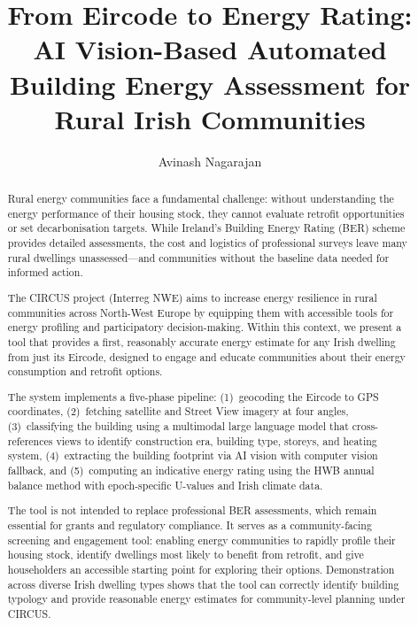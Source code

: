 \documentclass[preprint,12pt,authoryear]{elsarticle}
\begin{document}
\begin{frontmatter}

\title{From Eircode to Energy Rating: AI Vision-Based Automated Building Energy Assessment for Rural Irish Communities}

\author[mtu]{Avinash Nagarajan}


\begin{abstract}
Rural energy communities face a fundamental challenge: without understanding the energy performance of their housing stock, they cannot evaluate retrofit opportunities or set decarbonisation targets. While Ireland's Building Energy Rating (BER) scheme provides detailed assessments, the cost and logistics of professional surveys leave many rural dwellings unassessed---and communities without the baseline data needed for informed action.

The CIRCUS project (Interreg NWE) aims to increase energy resilience in rural communities across North-West Europe by equipping them with accessible tools for energy profiling and participatory decision-making. Within this context, we present a tool that provides a first, reasonably accurate energy estimate for any Irish dwelling from just its Eircode, designed to engage and educate communities about their energy consumption and retrofit options.

The system implements a five-phase pipeline: (1)~geocoding the Eircode to GPS coordinates, (2)~fetching satellite and Street View imagery at four angles, (3)~classifying the building using a multimodal large language model that cross-references views to identify construction era, building type, storeys, and heating system, (4)~extracting the building footprint via AI vision with computer vision fallback, and (5)~computing an indicative energy rating using the HWB annual balance method with epoch-specific U-values and Irish climate data.

The tool is not intended to replace professional BER assessments, which remain essential for grants and regulatory compliance. It serves as a community-facing screening and engagement tool: enabling energy communities to rapidly profile their housing stock, identify dwellings most likely to benefit from retrofit, and give householders an accessible starting point for exploring their options. Demonstration across diverse Irish dwelling types shows that the tool can correctly identify building typology and provide reasonable energy estimates for community-level planning under CIRCUS.
\end{abstract}


\end{frontmatter}
\end{document}
